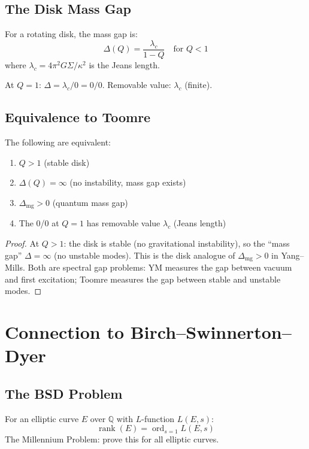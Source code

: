 \documentclass[11pt]{article}
\newcommand{\Q}{\mathbb{Q}}
\newcommand{\rank}{\operatorname{rank}}
\newcommand{\ord}{\operatorname{ord}}
\newcommand{\massgap}{\Delta_{\text{mg}}}
\begin{document}
\subsection{The Disk Mass Gap}

For a rotating disk, the mass gap is:
\[
  \Delta(Q) = \frac{\lambda_c}{1 - Q} \quad \text{for } Q < 1
\]
where $\lambda_c = 4\pi^2 G\Sigma / \kappa^2$ is the Jeans length.

At $Q = 1$: $\Delta = \lambda_c / 0 = 0/0$.  Removable value: $\lambda_c$
(finite).

\subsection{Equivalence to Toomre}

\begin{theorem}
The following are equivalent:
\begin{enumerate}
\item $Q > 1$ (stable disk)
\item $\Delta(Q) = \infty$ (no instability, mass gap exists)
\item $\massgap > 0$ (quantum mass gap)
\item The 0/0 at $Q = 1$ has removable value $\lambda_c$ (Jeans length)
\end{enumerate}
\end{theorem}

\begin{proof}
At $Q > 1$: the disk is stable (no gravitational instability), so the
``mass gap'' $\Delta = \infty$ (no unstable modes).  This is the disk
analogue of $\massgap > 0$ in Yang--Mills.  Both are spectral gap
problems: YM measures the gap between vacuum and first excitation;
Toomre measures the gap between stable and unstable modes.
\end{proof}

\section{Connection to Birch--Swinnerton--Dyer}

\subsection{The BSD Problem}

For an elliptic curve $E$ over $\Q$ with $L$-function $L(E,s)$:
\[
  \rank(E) = \ord_{s=1} L(E,s)
\]
The Millennium Problem: prove this for all elliptic curves.
\end{document}
